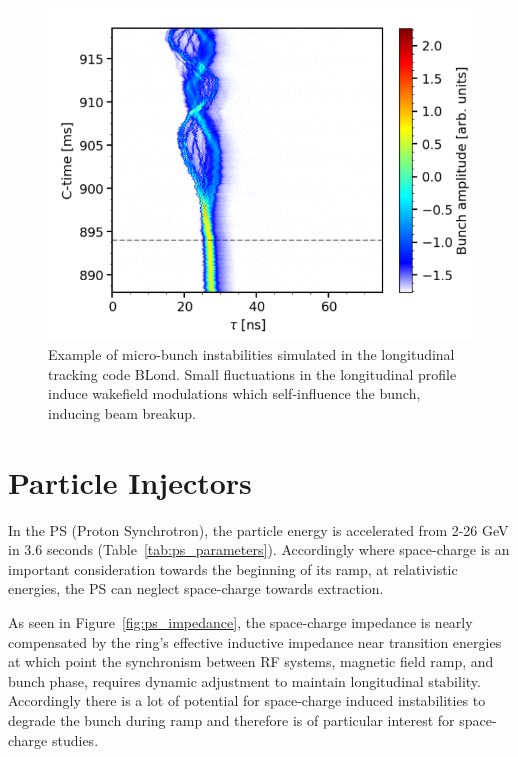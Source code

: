 \begin{figure}
    \centering
    \includegraphics{figs/micro_bunching_instabilities.PNG}
    \caption{Example of micro-bunch instabilities simulated in the longitudinal tracking code BLond. Small fluctuations in the longitudinal profile induce wakefield modulations which self-influence the bunch, inducing beam breakup.}
    \label{fig:microbunch_instabilities}
\end{figure}

\section{Particle Injectors}

In the PS (Proton Synchrotron), the particle energy is accelerated from 2-26 GeV in 3.6 seconds (Table~\ref{tab:ps_parameters}). Accordingly where space-charge is an important consideration towards the beginning of its ramp, at relativistic energies, the PS can neglect space-charge towards extraction.



As seen in Figure~\ref{fig:ps_impedance}, the space-charge impedance is nearly compensated by the ring's effective inductive impedance near transition energies at which point the synchronism between RF systems, magnetic field ramp, and bunch phase, requires dynamic adjustment to maintain longitudinal stability. Accordingly there is a lot of potential for space-charge induced instabilities to degrade the bunch during ramp and therefore is of particular interest for space-charge studies.

